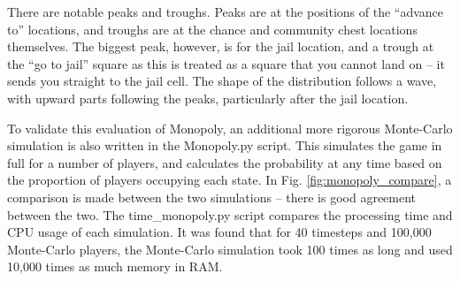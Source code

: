 \documentclass[12pt]{article}
\begin{document}
There are notable peaks and troughs. Peaks are at the positions of the ``advance to'' locations, and troughs are at the chance and community chest locations themselves. The biggest peak, however, is for the jail location, and a trough at the ``go to jail'' square as this is treated as a square that you cannot land on -- it sends you straight to the jail cell. The shape of the distribution follows a wave, with upward parts following the peaks, particularly after the jail location.

To validate this evaluation of Monopoly, an additional more rigorous Monte-Carlo simulation is also written in the Monopoly.py script. 
This simulates the game in full for a number of players, and calculates the probability at any time based on the proportion of players occupying each state.
In Fig. \ref{fig:monopoly_compare}, a comparison is made between the two simulations -- there is good agreement between the two.
The time\_monopoly.py script compares the processing time and CPU usage of each simulation. It was found that for 40 timesteps and 100,000 Monte-Carlo players, the Monte-Carlo simulation took 100 times as long and used 10,000 times as much memory in RAM.
\end{document}
